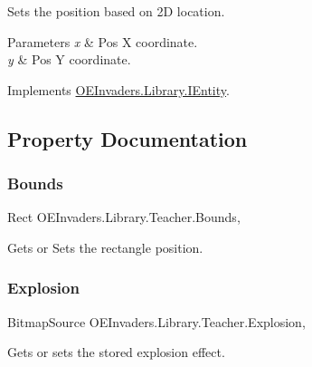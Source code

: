 Sets the position based on 2D location. 


\begin{DoxyParams}{Parameters}
{\em x} & Pos X coordinate.\\
\hline
{\em y} & Pos Y coordinate.\\
\hline
\end{DoxyParams}


Implements \mbox{\hyperlink{interface_o_e_invaders_1_1_library_1_1_i_entity_ae2cf61539ba662a6793fef01abcad2ef}{O\+E\+Invaders.\+Library.\+I\+Entity}}.



\subsection{Property Documentation}
\mbox{\label{class_o_e_invaders_1_1_library_1_1_teacher_a46be5300706e735f5d805eb9d2c9d520}} 
\subsubsection{\texorpdfstring{Bounds}{Bounds}}
{\footnotesize\ttfamily Rect O\+E\+Invaders.\+Library.\+Teacher.\+Bounds\hspace{0.3cm}{\ttfamily [get]}, {\ttfamily [set]}}



Gets or Sets the rectangle position. 

\mbox{\label{class_o_e_invaders_1_1_library_1_1_teacher_add76d080a1441b298366ffa13f205f5b}} 
\subsubsection{\texorpdfstring{Explosion}{Explosion}}
{\footnotesize\ttfamily Bitmap\+Source O\+E\+Invaders.\+Library.\+Teacher.\+Explosion\hspace{0.3cm}{\ttfamily [get]}, {\ttfamily [set]}}



Gets or sets the stored explosion effect. 

